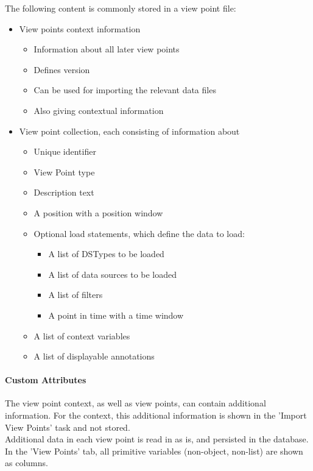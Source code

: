 The following content is commonly stored in a view point file:
 \begin{itemize}
 \item View points context information
 \begin{itemize}
 \item Information about all later view points
 \item Defines version
 \item Can be used for importing the relevant data files
 \item Also giving contextual information
 \end{itemize}
 \item View point collection, each consisting of information about
 \begin{itemize}
 \item Unique identifier
 \item View Point type
 \item Description text
 \item A position with a position window
 \item Optional load statements, which define the data to load:
 \begin{itemize}
 \item A list of DSTypes to be loaded
 \item A list of data sources to be loaded
 \item A list of filters
 \item A point in time with a time window
 \end{itemize}
 \item A list of context variables
 \item A list of displayable annotations
  \end{itemize}
 \end{itemize}

\paragraph{Custom Attributes}
\label{sec:view_points_custom_attributes} 

The view point context, as well as view points, can contain additional information. For the context, this additional information is shown in the 'Import View Points' task and not stored. \\

Additional data in each view point is read in as is, and persisted in the database. In the 'View Points' tab, all primitive variables (non-object, non-list) are shown as columns. \\

